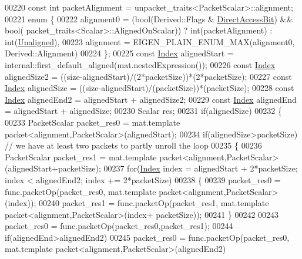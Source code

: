 \begin{DoxyCode}
00220     \textcolor{keyword}{const} \textcolor{keywordtype}{int} packetAlignment = unpacket\_traits<PacketScalar>::alignment;
00221     \textcolor{keyword}{enum} \{
00222       alignment0 = (bool(Derived::Flags & \hyperlink{group__flags_gabf1e9d0516a933445a4c307ad8f14915}{DirectAccessBit}) && bool(
      packet\_traits<Scalar>::AlignedOnScalar)) ? \textcolor{keywordtype}{int}(packetAlignment) : int(\hyperlink{group__enums_gga45fe06e29902b7a2773de05ba27b47a1ac935220b4c844108e183ebe30a4d5204}{Unaligned}),
00223       alignment = EIGEN\_PLAIN\_ENUM\_MAX(alignment0, Derived::Alignment)
00224     \};
00225     \textcolor{keyword}{const} \hyperlink{namespace_eigen_a62e77e0933482dafde8fe197d9a2cfde}{Index} alignedStart = internal::first\_default\_aligned(mat.nestedExpression());
00226     \textcolor{keyword}{const} \hyperlink{namespace_eigen_a62e77e0933482dafde8fe197d9a2cfde}{Index} alignedSize2 = ((size-alignedStart)/(2*packetSize))*(2*packetSize);
00227     \textcolor{keyword}{const} \hyperlink{namespace_eigen_a62e77e0933482dafde8fe197d9a2cfde}{Index} alignedSize = ((size-alignedStart)/(packetSize))*(packetSize);
00228     \textcolor{keyword}{const} \hyperlink{namespace_eigen_a62e77e0933482dafde8fe197d9a2cfde}{Index} alignedEnd2 = alignedStart + alignedSize2;
00229     \textcolor{keyword}{const} \hyperlink{namespace_eigen_a62e77e0933482dafde8fe197d9a2cfde}{Index} alignedEnd  = alignedStart + alignedSize;
00230     Scalar res;
00231     \textcolor{keywordflow}{if}(alignedSize)
00232     \{
00233       PacketScalar packet\_res0 = mat.template packet<alignment,PacketScalar>(alignedStart);
00234       \textcolor{keywordflow}{if}(alignedSize>packetSize) \textcolor{comment}{// we have at least two packets to partly unroll the loop}
00235       \{
00236         PacketScalar packet\_res1 = mat.template packet<alignment,PacketScalar>(alignedStart+packetSize);
00237         \textcolor{keywordflow}{for}(\hyperlink{namespace_eigen_a62e77e0933482dafde8fe197d9a2cfde}{Index} index = alignedStart + 2*packetSize; index < alignedEnd2; index += 2*packetSize)
00238         \{
00239           packet\_res0 = func.packetOp(packet\_res0, mat.template packet<alignment,PacketScalar>(index));
00240           packet\_res1 = func.packetOp(packet\_res1, mat.template packet<alignment,PacketScalar>(index+
      packetSize));
00241         \}
00242 
00243         packet\_res0 = func.packetOp(packet\_res0,packet\_res1);
00244         \textcolor{keywordflow}{if}(alignedEnd>alignedEnd2)
00245           packet\_res0 = func.packetOp(packet\_res0, mat.template packet<alignment,PacketScalar>(alignedEnd2)

\end{DoxyCode}
